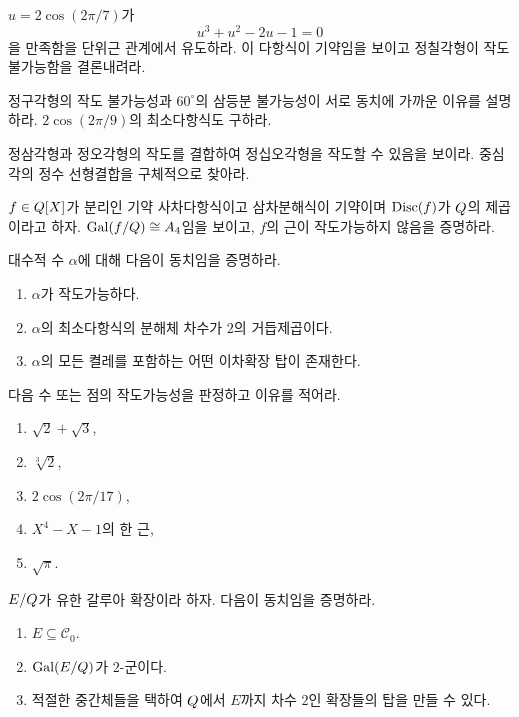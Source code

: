 \begin{exercise}
$u=2\cos(2\pi/7)$가
\[
  u^3+u^2-2u-1=0
\]
을 만족함을 단위근 관계에서 유도하라. 이 다항식이 기약임을 보이고 정칠각형이 작도 불가능함을 결론내려라.
\end{exercise}

\begin{exercise}[*]
정구각형의 작도 불가능성과 $60^\circ$의 삼등분 불가능성이 서로 동치에 가까운 이유를 설명하라. $2\cos(2\pi/9)$의 최소다항식도 구하라.
\end{exercise}

\begin{exercise}
정삼각형과 정오각형의 작도를 결합하여 정십오각형을 작도할 수 있음을 보이라. 중심각의 정수 선형결합을 구체적으로 찾아라.
\end{exercise}

\begin{exercise}[*]
$f\in Q[X]$가 분리인 기약 사차다항식이고 삼차분해식이 기약이며 $\operatorname{Disc}(f)$가 $Q$의 제곱이라고 하자. $\operatorname{Gal}(f/Q)\cong A_4$임을 보이고, $f$의 근이 작도가능하지 않음을 증명하라.
\end{exercise}

\begin{exercise}
대수적 수 $\alpha$에 대해 다음이 동치임을 증명하라.
\begin{enumerate}[label=(\roman*)]
  \item $\alpha$가 작도가능하다.
  \item $\alpha$의 최소다항식의 분해체 차수가 $2$의 거듭제곱이다.
  \item $\alpha$의 모든 켤레를 포함하는 어떤 이차확장 탑이 존재한다.
\end{enumerate}
\end{exercise}

\begin{exercise}[*]
다음 수 또는 점의 작도가능성을 판정하고 이유를 적어라.
\begin{enumerate}[label=(\alph*)]
  \item $\sqrt2+\sqrt3$,
  \item $\sqrt[3]2$,
  \item $2\cos(2\pi/17)$,
  \item $X^4-X-1$의 한 근,
  \item $\sqrt\pi$.
\end{enumerate}
\end{exercise}

\begin{exercise}
$E/Q$가 유한 갈루아 확장이라 하자. 다음이 동치임을 증명하라.
\begin{enumerate}[label=(\roman*)]
  \item $E\subseteq\mathcal C_0$.
  \item $\operatorname{Gal}(E/Q)$가 $2$-군이다.
  \item 적절한 중간체들을 택하여 $Q$에서 $E$까지 차수 $2$인 확장들의 탑을 만들 수 있다.
\end{enumerate}
\end{exercise}
